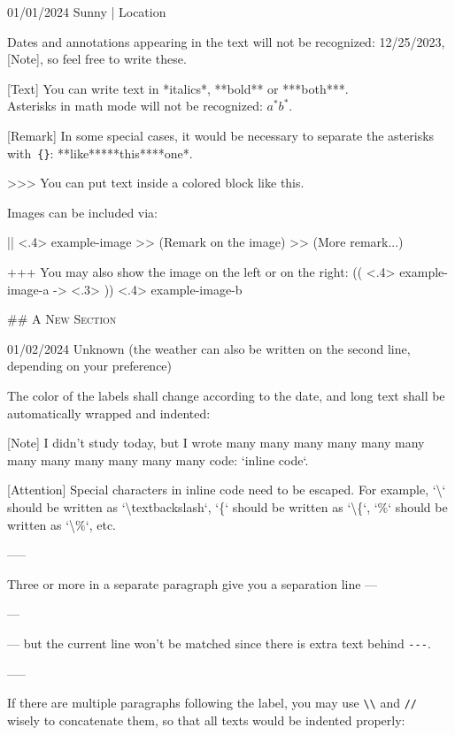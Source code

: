 \documentclass[11pt, paperstyle=light yellow, color entry, month-day-year,
  title in boldface, title in sffamily, use style = classical]{jwjournal}
\begin{document}
01/01/2024 Sunny | Location

  Dates and annotations appearing in the text will not be recognized: 12/25/2023, [Note], so feel free to write these.

  [Text]
    You can write text in *italics*, **bold** or ***both***.
    \\
    Asterisks in math mode will not be recognized: $a^* b^*$.

  [Remark] In some special cases, it would be necessary to separate the asterisks with~\texttt{\{\}}: **like**{}***this***{}*one*.

  >>> You can put text inside a colored block like this.

  Images can be included via:

  || <.4> {example-image} %
  >> (Remark on the image)
  >> (More remark...)

  +++
  You may also show the image on the left or on the right:
  (( <.4> {example-image-a} %
  -> <.3> %
  )) <.4> {example-image-b} %


## {\textsc{A New Section}}

01/02/2024
Unknown (the weather can also be written on the second line, depending on your preference)

  The color of the labels shall change according to the date, and long text shall be automatically wrapped and indented:

  [Note] I didn't study today, but I wrote many many many many many many many many many many many many code: `inline code`.

  [Attention] Special characters in inline code need to be escaped. For example, `\textbackslash` should be written as `\textbackslash textbackslash`, `\{` should be written as `\textbackslash\{`, `\%` should be written as `\textbackslash\%`, etc.

  -----

  Three or more \textquote{\texttt{-}} in a separate paragraph give you a separation line ---

  ---

  --- but the current line won't be matched since there is extra text behind \texttt{-}\texttt{-}\texttt{-}.

  -----

  If there are multiple paragraphs following the label, you may use \texttt{\textbackslash\textbackslash} and \texttt{\slash\slash} wisely to concatenate them, so that all texts would be indented properly:
\end{document}
